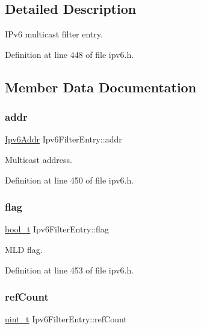\subsection{Detailed Description}
I\+Pv6 multicast filter entry. 

Definition at line 448 of file ipv6.\+h.



\subsection{Member Data Documentation}
\mbox{\label{structIpv6FilterEntry_ab3f4b20455a0f3d0912b2dfad354ef86}} 
\subsubsection{\texorpdfstring{addr}{addr}}
{\footnotesize\ttfamily \hyperlink{ipv6_8h_aed0cbc40c61ed5b4fb681ebc55237e89}{Ipv6\+Addr} Ipv6\+Filter\+Entry\+::addr}



Multicast address. 



Definition at line 450 of file ipv6.\+h.

\mbox{\label{structIpv6FilterEntry_a4ad89b0f2c7f11c673ffcf11768f5eb7}} 
\subsubsection{\texorpdfstring{flag}{flag}}
{\footnotesize\ttfamily \hyperlink{compiler__port_8h_a812d16e5494522586b3784e55d479912}{bool\+\_\+t} Ipv6\+Filter\+Entry\+::flag}



M\+LD flag. 



Definition at line 453 of file ipv6.\+h.

\mbox{\label{structIpv6FilterEntry_a1d01842023f238350bc3f6dfa99999c6}} 
\subsubsection{\texorpdfstring{ref\+Count}{refCount}}
{\footnotesize\ttfamily \hyperlink{compiler__port_8h_a12a1e9b3ce141648783a82445d02b58d}{uint\+\_\+t} Ipv6\+Filter\+Entry\+::ref\+Count}



